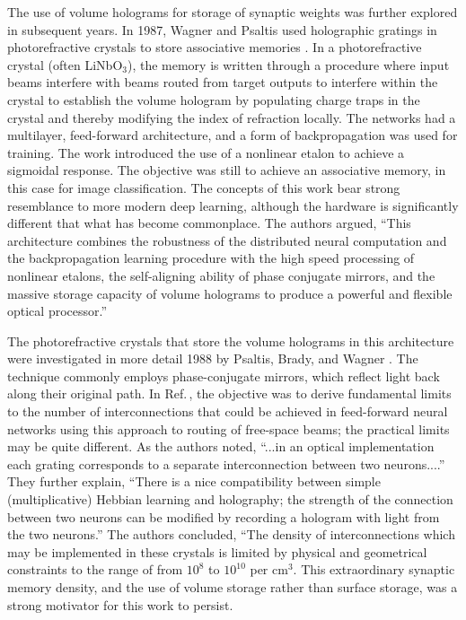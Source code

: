 The use of volume holograms for storage of synaptic weights was further explored in subsequent years. In 1987, Wagner and Psaltis used holographic gratings in photorefractive crystals to store associative memories \cite{waps1987}. In a photorefractive crystal (often LiNbO$_3$), the memory is written through a procedure where input beams interfere with beams routed from target outputs to interfere within the crystal to establish the volume hologram by populating charge traps in the crystal and thereby modifying the index of refraction locally. The networks had a multilayer, feed-forward architecture, and a form of backpropagation was used for training. The work introduced the use of a nonlinear etalon to achieve a sigmoidal response. The objective was still to achieve an associative memory, in this case for image classification. The concepts of this work bear strong resemblance to more modern deep learning, although the hardware is significantly different that what has become commonplace. The authors argued, ``This architecture combines the robustness of the distributed neural computation and the backpropagation learning procedure with the high speed processing of nonlinear etalons, the self-aligning ability of phase conjugate mirrors, and the massive storage capacity of volume holograms to produce a powerful and flexible optical processor.''

The photorefractive crystals that store the volume holograms in this architecture were investigated in more detail 1988 by Psaltis, Brady, and Wagner \cite{psbr1988}. The technique commonly employs phase-conjugate mirrors, which reflect light back along their original path. In Ref.\,\cite{psbr1988}, the objective was to derive fundamental limits to the number of interconnections that could be achieved in feed-forward neural networks using this approach to routing of free-space beams; the practical limits may be quite different. As the authors noted, ``...in an optical implementation each grating corresponds to a separate interconnection between two neurons....'' They further explain, ``There is a nice compatibility between simple (multiplicative) Hebbian learning and holography; the strength of the connection between two neurons can be modified by recording a hologram with light from the two neurons.'' The authors concluded, ``The density of interconnections which may be implemented in these crystals is limited by physical and geometrical constraints to the range of from $10^8$ to $10^{10}$ per cm$^3$. This extraordinary synaptic memory density, and the use of volume storage rather than surface storage, was a strong motivator for this work to persist. 
 
